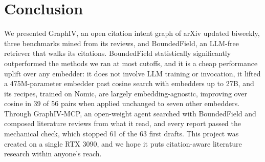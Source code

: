 \section{Conclusion}
\label{sec:conclusion}

We presented GraphIV, an open citation intent graph of arXiv updated biweekly, three benchmarks mined from its reviews, and BoundedField, an LLM-free retriever that walks its citations. BoundedField statistically significantly outperformed the methods we ran at most cutoffs, and it is a cheap performance uplift over any embedder: it does not involve LLM training or invocation, it lifted a 475M-parameter embedder past cosine search with embedders up to 27B, and its recipes, trained on Nomic, are largely embedding-agnostic, improving over cosine in 39 of 56 pairs when applied unchanged to seven other embedders. Through GraphIV-MCP, an open-weight agent searched with BoundedField and composed literature reviews from what it read, and every report passed the mechanical check, which stopped 61 of the 63 first drafts. This project was created on a single RTX 3090, and we hope it puts citation-aware literature research within anyone's reach.
